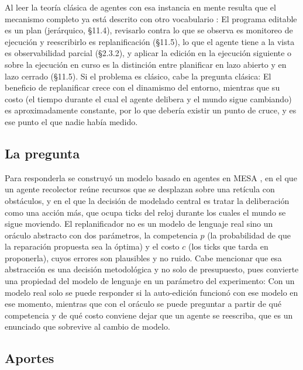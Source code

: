Al leer la teoría clásica de agentes con esa instancia en mente resulta que el mecanismo completo ya está descrito con otro vocabulario \parencite{russellNorvig2020}: El programa editable es un plan (jerárquico, §11.4), revisarlo contra lo que se observa es monitoreo de ejecución y reescribirlo es replanificación (§11.5), lo que el agente tiene a la vista es observabilidad parcial (§2.3.2), y aplicar la edición en la ejecución siguiente o sobre la ejecución en curso es la distinción entre planificar en lazo abierto y en lazo cerrado (§11.5). Si el problema es clásico, cabe la pregunta clásica: El beneficio de replanificar crece con el dinamismo del entorno, mientras que su costo (el tiempo durante el cual el agente delibera y el mundo sigue cambiando) es aproximadamente constante, por lo que debería existir un punto de cruce, y es ese punto el que nadie había medido.

\subsection{La pregunta}

\begin{quote}
  \itshape\proyPregunta
\end{quote}

Para responderla se construyó un modelo basado en agentes en MESA \parencite{kazil2020mesa}, en el que un agente recolector reúne recursos que se desplazan sobre una retícula con obstáculos, y en el que la decisión de modelado central es tratar la deliberación como una acción más, que ocupa ticks del reloj durante los cuales el mundo se sigue moviendo. El replanificador no es un modelo de lenguaje real sino un oráculo abstracto con dos parámetros, la competencia $p$ (la probabilidad de que la reparación propuesta sea la óptima) y el costo $c$ (los ticks que tarda en proponerla), cuyos errores son plausibles y no ruido. Cabe mencionar que esa abstracción es una decisión metodológica y no solo de presupuesto, pues convierte una propiedad del modelo de lenguaje en un parámetro del experimento: Con un modelo real solo se puede responder si la auto-edición funcionó con ese modelo en ese momento, mientras que con el oráculo se puede preguntar a partir de qué competencia y de qué costo conviene dejar que un agente se reescriba, que es un enunciado que sobrevive al cambio de modelo.

\subsection{Aportes}

